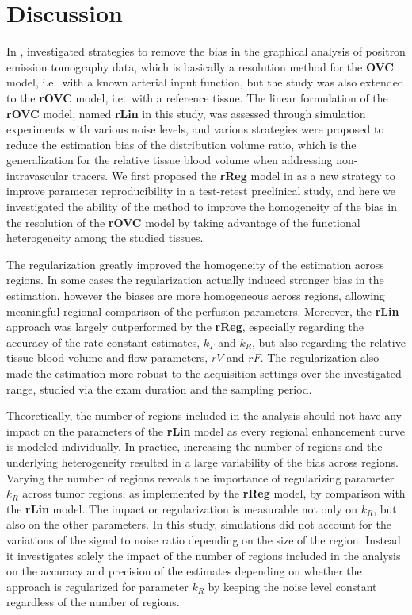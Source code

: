 \section{Discussion}
In \citeyear{Logan:2001ip}, \citet{Logan:2001ip} investigated strategies to remove the bias in the graphical analysis of positron emission tomography data, which is basically a resolution method for the \textbf{OVC} model, i.e.~with a known arterial input function, but the study was also extended to the \textbf{rOVC} model, i.e.~with a reference tissue.
The linear formulation of the \textbf{rOVC} model, named \textbf{rLin} in this study, was assessed through simulation experiments with various noise levels, and various strategies were proposed to reduce the estimation bias of the distribution volume ratio, which is the generalization for the relative tissue blood volume when addressing non-intravascular tracers.
We first proposed the \textbf{rReg} model in \cite{Doury:2016fi} as a new strategy to improve parameter reproducibility in a test-retest preclinical study, and here we investigated the ability of the method to improve the homogeneity of the bias in the resolution of the \textbf{rOVC} model by taking advantage of the functional heterogeneity among the studied tissues.

The regularization greatly improved the homogeneity of the estimation across regions.
In some cases the regularization actually induced stronger bias in the estimation, however the biases are more homogeneous across regions, allowing meaningful regional comparison of the perfusion parameters.
Moreover, the \textbf{rLin} approach was largely outperformed by the \textbf{rReg}, especially regarding the accuracy of the rate constant estimates, $k_T$ and $k_R$, but also regarding the relative tissue blood volume and flow parameters, $rV$ and $rF$.
The regularization also made the estimation more robust to the acquisition settings over the investigated range, studied via the exam duration and the sampling period.

Theoretically, the number of regions included in the analysis should not have any impact on the parameters of the \textbf{rLin} model as every regional enhancement curve is modeled individually. 
In practice, increasing the number of regions and the underlying heterogeneity resulted in a large variability of the bias across regions.
Varying the number of regions reveals the importance of regularizing parameter $k_R$ across tumor regions, as implemented by the \textbf{rReg} model, by comparison with the \textbf{rLin} model.
The impact or regularization is measurable not only on $k_R$, but also on the other parameters.
In this study, simulations did not account for the variations of the signal to noise ratio depending on the size of the region.
Instead it investigates solely the impact of the number of regions included in the analysis on the accuracy and precision of the estimates depending on whether the approach is regularized for parameter $k_R$ by keeping the noise level constant regardless of the number of regions.

